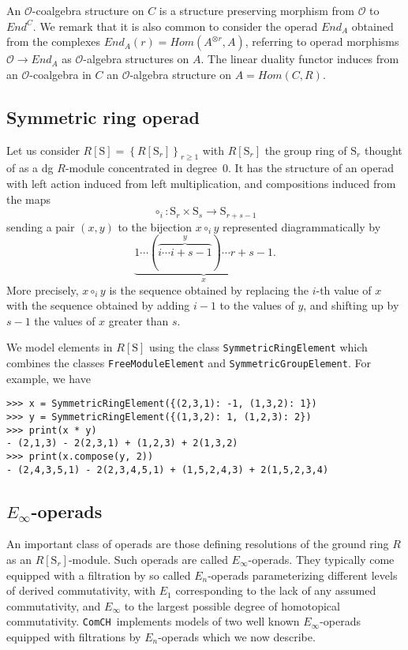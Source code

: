 \documentclass{amsart}
\renewcommand{\S}{\mathrm S}
\newcommand{\comch}{\texttt{ComCH}}
\begin{document}
An $\mathcal O$-coalgebra structure on $C$ is a structure preserving morphism from $\mathcal O$ to $End^C$. We remark that it is also common to consider the operad $End_A$ obtained from the complexes $End_A(r) = Hom(A^{\otimes r}, A)$, referring to operad morphisms $\mathcal O \to End_A$ as $\mathcal O$-algebra structures on $A$. The linear duality functor induces from an $\mathcal O$-coalgebra in $C$ an $\mathcal O$-algebra structure on $A = Hom(C, R)$.

\subsection{Symmetric ring operad}

Let us consider $R[\S] = \left\{R[\S_r]\right\}_{r \geq 1}$ with $R[\S_r]$ the group ring of $\S_r$ thought of as a dg $R$-module concentrated in degree~$0$. It has the structure of an operad with left action induced from left multiplication, and compositions induced from the maps
\begin{equation} \label{eq: compostion of permutations}
\circ_i \colon \S_r \times \S_s \to \S_{r+s-1}
\end{equation}
sending a pair $(x, y)$ to the bijection $x \circ_i y$ represented diagrammatically by
\begin{equation*}
\underbrace{1 \cdots (\overbrace{i \cdots i+s-1}^y) \cdots r+s-1}_x.
\end{equation*}
More precisely, $x \circ_i y$ is the sequence obtained by replacing the $i$-th value of $x$ with the sequence obtained by adding $i-1$ to the values of $y$, and shifting up by $s-1$ the values of $x$ greater than $s$. 

We model elements in $R[\S]$ using the class \texttt{SymmetricRingElement} which combines the classes \texttt{FreeModuleElement} and \texttt{SymmetricGroupElement}. For example, we have
\begin{verbatim}
>>> x = SymmetricRingElement({(2,3,1): -1, (1,3,2): 1})
>>> y = SymmetricRingElement({(1,3,2): 1, (1,2,3): 2})
>>> print(x * y)
- (2,1,3) - 2(2,3,1) + (1,2,3) + 2(1,3,2)
>>> print(x.compose(y, 2))
- (2,4,3,5,1) - 2(2,3,4,5,1) + (1,5,2,4,3) + 2(1,5,2,3,4)
\end{verbatim}

\subsection{$E_\infty$-operads}

An important class of operads are those defining resolutions of the ground ring $R$ as an $R[\S_r]$-module. Such operads are called \mbox{$E_\infty$-operads}. They typically come equipped with a filtration by so called $E_n$-operads parameterizing different levels of derived commutativity, with $E_1$ corresponding to the lack of any assumed commutativity, and $E_\infty$ to the largest possible degree of homotopical commutativity. \comch\, implements models of two well known $E_\infty$-operads equipped with filtrations by $E_n$-operads which we now describe.
\end{document}
